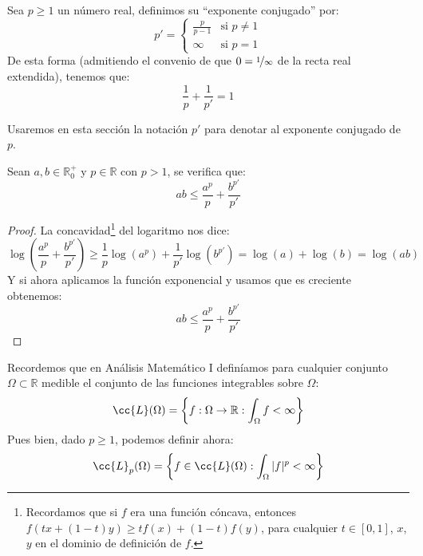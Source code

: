 \begin{definicion}
    Sea $p\geq 1$ un número real, definimos su ``exponente conjugado'' por:
    \begin{equation*}
        p' = \left\{\begin{array}{ll}
                \frac{p}{p-1} & \text{si\ } p\neq 1 \\
                \infty & \text{si\ } p = 1
        \end{array}\right.
    \end{equation*}
    De esta forma (admitiendo el convenio de que $0 = \nicefrac{1}{\infty}$ de la recta real extendida), tenemos que:
    \begin{equation*}
        \dfrac{1}{p} + \dfrac{1}{p'} = 1
    \end{equation*}
\end{definicion}
\noindent
Usaremos en esta sección la notación $p'$ para denotar al exponente conjugado de $p$.

\begin{prop}
    Sean $a,b\in \mathbb{R}^+_0$ y $p\in \mathbb{R}$ con $p>1$, se verifica que:
    \begin{equation*}
        ab \leq \dfrac{a^p}{p} + \dfrac{b^{p'}}{p'}
    \end{equation*}
    \begin{proof}
        La concavidad\footnote{Recordamos que si $f$ era una función cóncava, entonces $f(tx+(1-t)y) \geq tf(x)+(1-t)f(y)$, para cualquier $t\in [0,1]$, $x$,$y$ en el dominio de definición de $f$.} del logaritmo nos dice:
        \begin{equation*}
            \log\left(\dfrac{a^p}{p} + \dfrac{b^{p'}}{p'}\right) \geq \dfrac{1}{p}\log(a^p) + \dfrac{1}{p'}\log\left(b^{p'}\right) = \log(a) + \log(b) = \log(ab)
        \end{equation*}
        Y si ahora aplicamos la función exponencial y usamos que es creciente obtenemos:
        \begin{equation*}
            ab \leq \dfrac{a^p}{p} + \dfrac{b^{p'}}{p'}
        \end{equation*}
    \end{proof}
\end{prop}

\noindent
Recordemos que en Análisis Matemático I definíamos para cualquier conjunto $\Omega\subset \mathbb{R}$ medible el conjunto de las funciones integrables sobre $\Omega$:
\begin{equation*}
    \cc{L}(\Omega) = \left\{f:\Omega\to \mathbb{R} : \int_\Omega f < \infty\right\}
\end{equation*}
Pues bien, dado $p\geq 1$, podemos definir ahora:
\begin{equation*}
    \cc{L}_p(\Omega) = \left\{f\in \cc{L}(\Omega) : \int_\Omega |f|^p < \infty\right\}
\end{equation*}


